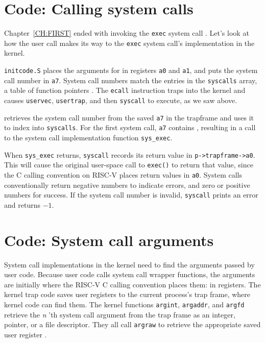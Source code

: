 \section{Code: Calling system calls}

Chapter~\ref{CH:FIRST} ended with 
invoking the {\tt exec} system call
.
Let's look at how the user call
makes its way to the {\tt exec} system call's
implementation in the kernel.

{\tt initcode.S}
places the arguments for
in registers {\tt a0} and {\tt a1}, and puts the
system call number in
\texttt{a7}.
System call numbers match the entries in the {\tt syscalls} array,
a table of function pointers
.
The \lstinline{ecall} instruction traps into the kernel
and causes
{\tt uservec},
{\tt usertrap}, and then {\tt syscall} to execute, as we saw above.

retrieves the system call number from the saved
\texttt{a7} in the trapframe
and uses it to index into {\tt syscalls}.
For the first system call, 
\texttt{a7}
contains 
,
resulting in a call to the system call implementation function
\lstinline{sys_exec}.

When \lstinline{sys_exec} returns,
\lstinline{syscall}
records its return value in
\lstinline{p->trapframe->a0}.
This will cause the original user-space call to 
{\tt exec()} to return that value, since the C
calling convention on RISC-V places return values in {\tt a0}.
System calls conventionally return negative numbers to indicate
errors, and zero or positive numbers for success.
If the system call number is invalid,
\lstinline{syscall}
prints an error and returns $-1$.

\section{Code: System call arguments}

System call implementations in the kernel need to find the arguments
passed by user code. Because user code calls system call wrapper
functions, the arguments are initially where the RISC-V C calling
convention places them: in registers.
The kernel trap code saves user registers to the current
process's trap frame, where kernel code can find them.
The kernel functions
\lstinline{argint},
\lstinline{argaddr},
and
\lstinline{argfd}
retrieve the 
\textit{n} 'th 
system call argument
from the trap frame
as an integer, pointer, or a file descriptor.
They all call {\tt argraw} to retrieve the appropriate saved
user register
.

